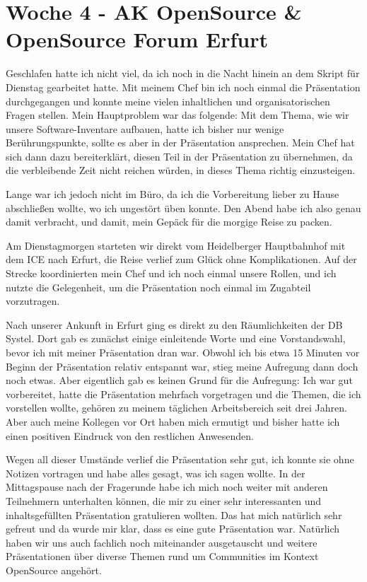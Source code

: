 \section{Woche 4 - AK OpenSource \& OpenSource Forum Erfurt} \label{sec:bericht-wo-4}

Geschlafen hatte ich nicht viel, da ich noch in die Nacht hinein an dem Skript für Dienstag gearbeitet hatte.
Mit meinem Chef bin ich noch einmal die Präsentation durchgegangen und konnte meine vielen inhaltlichen und organisatorischen Fragen stellen.
Mein Hauptproblem war das folgende: Mit dem Thema, wie wir unsere Software-Inventare aufbauen, hatte ich bisher nur wenige Berührungspunkte, sollte es aber in der Präsentation ansprechen.
Mein Chef hat sich dann dazu bereiterklärt, diesen Teil in der Präsentation zu übernehmen, da die verbleibende Zeit nicht reichen würden, in dieses Thema richtig einzusteigen.

Lange war ich jedoch nicht im Büro, da ich die Vorbereitung lieber zu Hause abschließen wollte, wo ich ungestört üben konnte.
Den Abend habe ich also genau damit verbracht, und damit, mein Gepäck für die morgige Reise zu packen.

Am Dienstagmorgen starteten wir direkt vom Heidelberger Hauptbahnhof mit dem ICE nach Erfurt, die Reise verlief zum Glück ohne Komplikationen.
Auf der Strecke koordinierten mein Chef und ich noch einmal unsere Rollen, und ich nutzte die Gelegenheit, um die Präsentation noch einmal im Zugabteil vorzutragen.

Nach unserer Ankunft in Erfurt ging es direkt zu den Räumlichkeiten der DB Systel.
Dort gab es zunächst einige einleitende Worte und eine Vorstandswahl, bevor ich mit meiner Präsentation dran war.
Obwohl ich bis etwa 15 Minuten vor Beginn der Präsentation relativ entspannt war, stieg meine Aufregung dann doch noch etwas.
Aber eigentlich gab es keinen Grund für die Aufregung:
Ich war gut vorbereitet, hatte die Präsentation mehrfach vorgetragen und die Themen, die ich vorstellen wollte, gehören zu meinem täglichen Arbeitsbereich seit drei Jahren.
Aber auch meine Kollegen vor Ort haben mich ermutigt und bisher hatte ich einen positiven Eindruck von den restlichen Anwesenden.

Wegen all dieser Umstände verlief die Präsentation sehr gut, ich konnte sie ohne Notizen vortragen und habe alles gesagt, was ich sagen wollte.
In der Mittagspause nach der Fragerunde habe ich mich noch weiter mit anderen Teilnehmern unterhalten können, die mir zu einer sehr interessanten und inhaltsgefüllten Präsentation gratulieren wollten.
Das hat mich natürlich sehr gefreut und da wurde mir klar, dass es eine gute Präsentation war.
Natürlich haben wir uns auch fachlich noch miteinander ausgetauscht und weitere Präsentationen über diverse Themen rund um Communities im Kontext OpenSource angehört.

